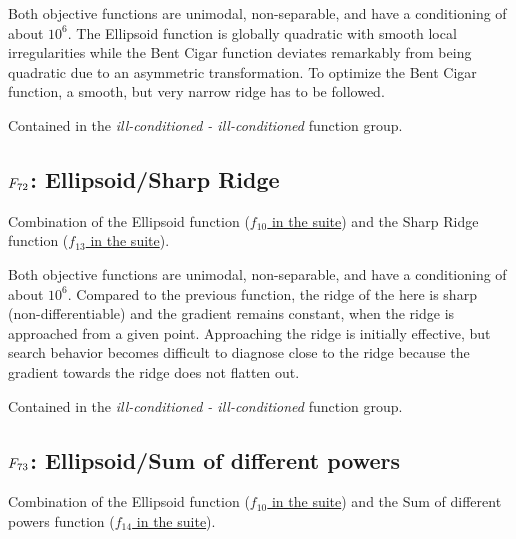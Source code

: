 Both objective functions are unimodal, non-separable, and have a conditioning
of about \(10^6\). The Ellipsoid function is globally quadratic with
smooth local irregularities while the Bent Cigar function deviates remarkably
from being quadratic due to an asymmetric transformation. To optimize the
Bent Cigar function, a smooth, but very narrow ridge has to be followed.

Contained in the \emph{ill-conditioned - ill-conditioned} function group.



\subsection[\texorpdfstring{\protect\(F_{72}\protect\): Ellipsoid/Sharp Ridge}{F72: Ellipsoid/Sharp Ridge}]{\texorpdfstring{\protect\(F_{72}\protect\): Ellipsoid/Sharp Ridge}{}}
\label{index:ellipsoid-sharp-ridge}\label{index:f72}
Combination of the Ellipsoid function (\href{https://coco.gforge.inria.fr/downloads/download16.00/bbobdocfunctions.pdf\#page=50}{\(f_{10}\) in the \bbob suite}) and the
Sharp Ridge function (\href{https://coco.gforge.inria.fr/downloads/download16.00/bbobdocfunctions.pdf\#page=65}{\(f_{13}\) in the \bbob suite}).

Both objective functions are unimodal, non-separable, and have a conditioning
of about \(10^6\). Compared to the previous function, the ridge of the
here is sharp (non-differentiable) and the gradient remains constant, when the
ridge is approached from a given point. Approaching the ridge is
initially effective, but search behavior becomes difficult to diagnose
close to the ridge because the gradient towards the ridge does not flatten out.

Contained in the \emph{ill-conditioned - ill-conditioned} function group.



\subsection[\texorpdfstring{\protect\(F_{73}\protect\): Ellipsoid/Sum of different powers}{F73: Ellipsoid/Sum of different powers}]{\texorpdfstring{\protect\(F_{73}\protect\): Ellipsoid/Sum of different powers}{}}
\label{index:ellipsoid-sum-of-different-powers}\label{index:f73}
Combination of the Ellipsoid function (\href{https://coco.gforge.inria.fr/downloads/download16.00/bbobdocfunctions.pdf\#page=50}{\(f_{10}\) in the \bbob suite}) and the
Sum of different powers function (\href{https://coco.gforge.inria.fr/downloads/download16.00/bbobdocfunctions.pdf\#page=70}{\(f_{14}\) in the \bbob suite}).

